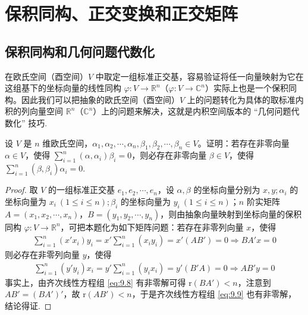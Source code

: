 \documentclass[../../main.tex]{subfiles}%
\begin{document}
\section{保积同构、正交变换和正交矩阵}

\subsection{保积同构和几何问题代数化}

在欧氏空间（酉空间）\(V\) 中取定一组标准正交基，容易验证将任一向量映射为它在这组基下的坐标向量的线性同构 \(\varphi:V\rightarrow\mathbb{R}^n\)（\(\varphi:V\rightarrow\mathbb{C}^n\)）实际上也是一个保积同构。因此我们可以把抽象的欧氏空间（酉空间）\(V\) 上的问题转化为具体的取标准内积的列向量空间 \(\mathbb{R}^n\)（\(\mathbb{C}^n\)）上的问题来解决，这就是内积空间版本的 “几何问题代数化” 技巧.

\begin{example}\label{example:例9.32}
设 \(V\) 是 \(n\) 维欧氏空间，\(\alpha_1,\alpha_2,\cdots,\alpha_n,\beta_1,\beta_2,\cdots,\beta_n\in V\)。证明：若存在非零向量 \(\alpha\in V\)，使得 \(\sum_{i = 1}^{n}(\alpha,\alpha_i)\beta_i = 0\)，则必存在非零向量 \(\beta\in V\)，使得 \(\sum_{i = 1}^{n}(\beta,\beta_i)\alpha_i = 0\).
\end{example}
\begin{proof}
取 \(V\) 的一组标准正交基 \(e_1,e_2,\cdots,e_n\)，设 \(\alpha,\beta\) 的坐标向量分别为 \(x,y\);$\,$\(\alpha_i\) 的坐标向量为 \(x_i\ (1\leqslant  i\leqslant  n)\);$\,$\(\beta_i\) 的坐标向量为 \(y_i\ (1\leqslant  i\leqslant  n)\)；\(n\) 阶实矩阵 \(A=(x_1,x_2,\cdots,x_n)\)，\(B=(y_1,y_2,\cdots,y_n)\)，则由抽象向量映射到坐标向量的保积同构 \(\varphi:V\rightarrow\mathbb{R}^n\)，可把本题化为如下矩阵问题：若存在非零列向量 \(x\)，使得
\begin{align}
\sum_{i = 1}^{n}(x'x_i)y_i = x'\sum_{i = 1}^{n}(x_iy_i) = x'(AB') =0 \Rightarrow BA'x = 0\label{eq:9.8}
\end{align}
则必存在非零列向量 \(y\)，使得
\begin{align}
\sum_{i = 1}^{n}(y'y_i)x_i = y'\sum_{i = 1}^{n}(y_ix_i) = y'(B'A) =0 \Rightarrow AB'y = 0\label{eq:9.9}
\end{align}
事实上，由齐次线性方程组 \eqref{eq:9.8} 有非零解可得 \(\mathrm{r}(BA') < n\)，注意到 \(AB'=(BA')'\)，故 \(\mathrm{r}(AB') < n\)，于是齐次线性方程组 \eqref{eq:9.9} 也有非零解，结论得证. 
\end{proof}
\end{document}

